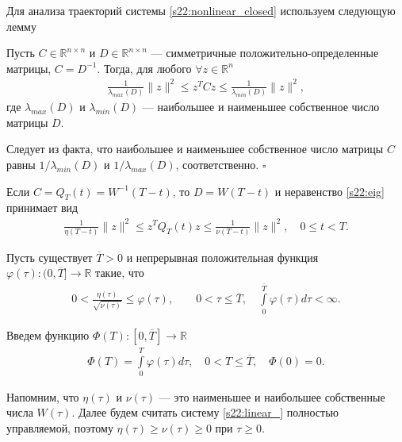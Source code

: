 \documentclass[../main.tex]{subfiles}
\begin{document}
Для анализа траекторий системы \eqref{s22:nonlinear_closed} используем следующую лемму
\begin{lemma}\label{s22:lem:zqz} 
 Пусть $C\in \mathbb{R}^{ n \times n}$ и $D\in \mathbb{R}^{n \times n}$ --- симметричные положительно-определенные матрицы, $C=D^{-1}$. 
Тогда, для любого $\forall z \in \mathbb{R}^{n}$ 
 \begin{gather} \label{s22:eig}
 \frac{1}{\lambda_{max}(D)} \|z\|^2 \leqslant z^T C z \leqslant \frac{1}{\lambda_{min}(D)} \|z\|^2,
 \end{gather}
 где $\lambda_{max}(D)$ и $\lambda_{min}(D)$ --- наибольшее и наименьшее собственное число матрицы $D$.
\end{lemma}
\doc 
 Следует из факта, что наибольшее и наименьшее собственное число матрицы $C$ равны $1/{\lambda_{min}(D)}$ и $1/{\lambda_{max}(D)}$, соответственно. \hfill $ \square $

Если $C=Q_T(t)=W^{-1}(T-t)$, то $D=W(T-t)$ и неравенство \eqref{s22:eig} принимает вид
\begin{gather*} %
 \frac{1}{\eta(T-t)} \|z\|^2 \leqslant z^T Q_T(t) z \leqslant \frac{1}{\nu(T-t)} \|z\|^2, \quad 0\leqslant t < T.
 \end{gather*}
\begin{assumption} \label{s22:asm1} 
 Пусть существует $\overline{T}>0$ и непрерывная положительная функция $\varphi(\tau): (0, \overline{T}] \to \mathbb{R}$ такие, что
\begin{gather*}
 0 < \frac{\eta(\tau)}{\sqrt{\nu(\tau)}} \leqslant \varphi(\tau), \qquad 0 < \tau \leqslant \overline{T},\quad \int\limits_0^ {\overline{T}}\varphi(\tau) d\tau<\infty.
\end{gather*} 
\end{assumption}
Введем функцию $\Phi(T): [0, \overline{T}] \to \mathbb{R}$
\begin{gather*}
 \Phi(T)= \int\limits_0^ {T}\varphi(\tau) d\tau,\quad 0 < T \leqslant \overline{T},\quad \Phi(0)=0.
\end{gather*} 

Напомним, что $\eta(\tau)$ и $\nu(\tau)$ --- это наименьшее и наибольшее собственные числа $W(\tau)$. 
Далее будем считать систему \eqref{s22:linear_} полностью управляемой, поэтому $\eta(\tau) \geqslant \nu(\tau) \geqslant 0$ при $\tau \geqslant 0$.
 
\end{document}

